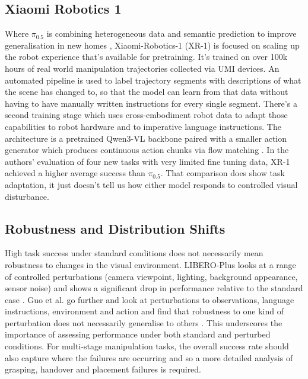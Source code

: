 \documentclass[10pt,twocolumn,letterpaper]{article}
\begin{document}
\subsection{Xiaomi Robotics 1}
Where $\pi_{0.5}$ is combining heterogeneous data and semantic prediction to improve generalisation in new homes \cite{black2025pi05}, Xiaomi-Robotics-1 (XR-1) is focused on scaling up the robot experience that's available for pretraining. It's trained on over 100k hours of real world manipulation trajectories collected via UMI devices. An automated pipeline is used to label trajectory segments with descriptions of what the scene has changed to, so that the model can learn from that data without having to have manually written instructions for every single segment. There's a second training stage which uses cross-embodiment robot data to adapt those capabilities to robot hardware and to imperative language instructions. The architecture is a pretrained Qwen3-VL backbone paired with a smaller action generator which produces continuous action chunks via flow matching \cite{team2026xiaomi}. In the authors' evaluation of four new tasks with very limited fine tuning data, XR-1 achieved a higher average success than $\pi_{0.5}$. That comparison does show task adaptation, it just doesn't tell us how either model responds to controlled visual disturbance.

\subsection{Robustness and Distribution Shifts}
High task success under standard conditions does not necessarily mean robustness to changes in the visual environment. LIBERO-Plus looks at a range of controlled perturbations (camera viewpoint, lighting, background appearance, sensor noise) and shows a significant drop in performance relative to the standard case \cite{fei2026liberoplus}. Guo et al. go further and look at perturbations to observations, language instructions, environment and action and find that robustness to one kind of perturbation does not necessarily generalise to others \cite{guo2026robustvla}. This underscores the importance of assessing performance under both standard and perturbed conditions. For multi-stage manipulation tasks, the overall success rate should also capture where the failures are occurring and so a more detailed analysis of grasping, handover and placement failures is required.
\end{document}
